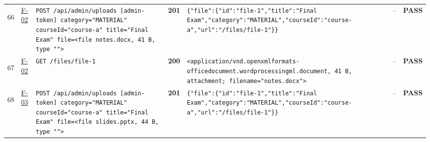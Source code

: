 \documentclass[10pt,a4paper]{article}
\begin{document}
\begin{landscape}
\begin{longtable}{@{}P{0.6cm}P{0.9cm}P{8.5cm}P{1.0cm}P{6.2cm}P{4.2cm}P{1.1cm}@{}}
\hypertarget{call66}{66} & \hyperlink{test-F-02}{F-02} & \texttt{POST /\allowbreak{}api/\allowbreak{}admin/\allowbreak{}uploads [admin-\allowbreak{}token] category=\allowbreak{}"\allowbreak{}MATERIAL"\allowbreak{} courseId=\allowbreak{}"\allowbreak{}course-\allowbreak{}a"\allowbreak{} title=\allowbreak{}"\allowbreak{}Final Exam"\allowbreak{} file=\allowbreak{}<file notes.\allowbreak{}docx,\allowbreak{} 41 B,\allowbreak{} type "\allowbreak{}"\allowbreak{}>} & \textcolor{passgreen}{\textbf{201}} & \texttt{\{"\allowbreak{}file"\allowbreak{}:\allowbreak{}\{"\allowbreak{}id"\allowbreak{}:\allowbreak{}"\allowbreak{}file-\allowbreak{}1"\allowbreak{},\allowbreak{}"\allowbreak{}title"\allowbreak{}:\allowbreak{}"\allowbreak{}Final Exam"\allowbreak{},\allowbreak{}"\allowbreak{}category"\allowbreak{}:\allowbreak{}"\allowbreak{}MATERIAL"\allowbreak{},\allowbreak{}"\allowbreak{}courseId"\allowbreak{}:\allowbreak{}"\allowbreak{}course-\allowbreak{}a"\allowbreak{},\allowbreak{}"\allowbreak{}url"\allowbreak{}:\allowbreak{}"\allowbreak{}/\allowbreak{}files/\allowbreak{}file-\allowbreak{}1"\allowbreak{}\}\}} & -- & \textcolor{passgreen}{\textbf{PASS}} \\
\hypertarget{call67}{67} & \hyperlink{test-F-02}{F-02} & \texttt{GET /\allowbreak{}files/\allowbreak{}file-\allowbreak{}1} & \textcolor{passgreen}{\textbf{200}} & \texttt{<application/\allowbreak{}vnd.\allowbreak{}openxmlformats-\allowbreak{}officedocument.\allowbreak{}wordprocessingml.\allowbreak{}document,\allowbreak{} 41 B,\allowbreak{} attachment; filename=\allowbreak{}"\allowbreak{}notes.\allowbreak{}docx"\allowbreak{}>} & -- & \textcolor{passgreen}{\textbf{PASS}} \\
\hypertarget{call68}{68} & \hyperlink{test-F-03}{F-03} & \texttt{POST /\allowbreak{}api/\allowbreak{}admin/\allowbreak{}uploads [admin-\allowbreak{}token] category=\allowbreak{}"\allowbreak{}MATERIAL"\allowbreak{} courseId=\allowbreak{}"\allowbreak{}course-\allowbreak{}a"\allowbreak{} title=\allowbreak{}"\allowbreak{}Final Exam"\allowbreak{} file=\allowbreak{}<file slides.\allowbreak{}pptx,\allowbreak{} 44 B,\allowbreak{} type "\allowbreak{}"\allowbreak{}>} & \textcolor{passgreen}{\textbf{201}} & \texttt{\{"\allowbreak{}file"\allowbreak{}:\allowbreak{}\{"\allowbreak{}id"\allowbreak{}:\allowbreak{}"\allowbreak{}file-\allowbreak{}1"\allowbreak{},\allowbreak{}"\allowbreak{}title"\allowbreak{}:\allowbreak{}"\allowbreak{}Final Exam"\allowbreak{},\allowbreak{}"\allowbreak{}category"\allowbreak{}:\allowbreak{}"\allowbreak{}MATERIAL"\allowbreak{},\allowbreak{}"\allowbreak{}courseId"\allowbreak{}:\allowbreak{}"\allowbreak{}course-\allowbreak{}a"\allowbreak{},\allowbreak{}"\allowbreak{}url"\allowbreak{}:\allowbreak{}"\allowbreak{}/\allowbreak{}files/\allowbreak{}file-\allowbreak{}1"\allowbreak{}\}\}} & -- & \textcolor{passgreen}{\textbf{PASS}} \\

\end{longtable}
\end{landscape}
\end{document}
